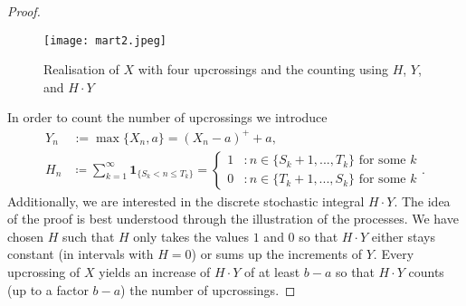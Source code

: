 \begin{proof}[Proof]



			\begin{figure}[H]
				\texttt{[image: mart2.jpeg]}
				\vspace{-5mm}
				\caption*{Realisation of $X$ with four upcrossings and the counting using $H$, $Y$, and $H\cdot Y$}
			\end{figure}	


	In order to count the number of upcrossings we introduce 	 
	\begin{align*}
		Y_n&:= \max\{X_n,a\}=(X_n-a)^++a,\\
		H_n &\coloneqq \sum\limits_{k=1}^{\infty}\mathbf 1_{\{S_k<n\leq T_k\}}=\begin{cases}1&: n\in \{S_k+1,...,T_k\}\text{ for some }k\\0&:n\in \{T_k+1,...,S_k\}\text{ for some }k \end{cases}.
	\end{align*}	
	Additionally, we are interested in the discrete stochastic integral $H\cdot Y$. The idea of the proof is best understood through the illustration of the processes. We have chosen $H$ such that $H$ only takes the values $1$ and $0$ so that $H\cdot Y$ either stays constant (in intervals with $H=0$) or sums up the increments of $Y$. Every upcrossing of $X$ yields an increase of $H\cdot Y$ of at least $b-a$ so that $H\cdot Y$ counts (up to a factor $b-a$) the number of upcrossings.\smallskip
	

\end{proof}

